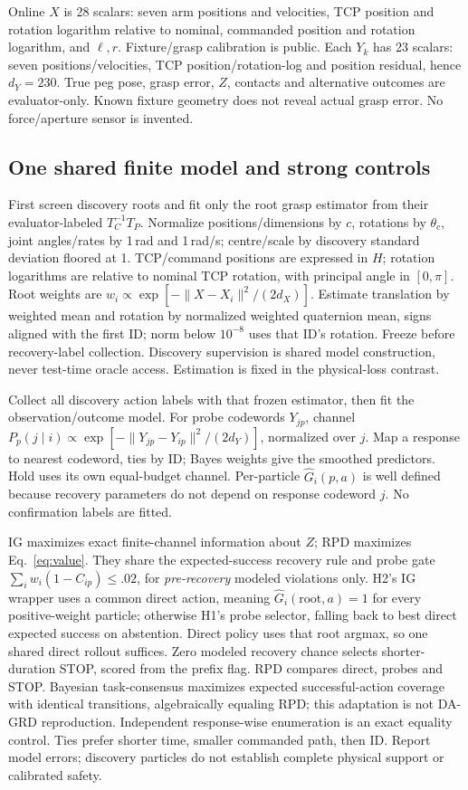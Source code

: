Online $X$ is 28 scalars: seven arm positions and velocities, TCP position and rotation logarithm relative to nominal, commanded position and rotation logarithm, and $\ell,r$. Fixture/grasp calibration is public. Each $Y_k$ has 23 scalars: seven positions/velocities, TCP position/rotation-log and position residual, hence $d_Y=230$. True peg pose, grasp error, $Z$, contacts and alternative outcomes are evaluator-only. Known fixture geometry does not reveal actual grasp error. No force/aperture sensor is invented.

\subsection{One shared finite model and strong controls}
First screen discovery roots and fit only the root grasp estimator from their evaluator-labeled $T_C^{-1}T_P$. Normalize positions/dimensions by $c$, rotations by $\theta_c$, joint angles/rates by 1\,rad and 1\,rad/s; centre/scale by discovery standard deviation floored at 1. TCP/command positions are expressed in $H$; rotation logarithms are relative to nominal TCP rotation, with principal angle in $[0,\pi]$. Root weights are $w_i\propto\exp[-\|X-X_i\|^2/(2d_X)]$. Estimate translation by weighted mean and rotation by normalized weighted quaternion mean, signs aligned with the first ID; norm below $10^{-8}$ uses that ID's rotation. Freeze before recovery-label collection. Discovery supervision is shared model construction, never test-time oracle access. Estimation is fixed in the physical-loss contrast.

Collect all discovery action labels with that frozen estimator, then fit the observation/outcome model. For probe codewords $Y_{jp}$, channel $P_p(j\mid i)\propto\exp[-\|Y_{jp}-Y_{ip}\|^2/(2d_Y)]$, normalized over $j$. Map a response to nearest codeword, ties by ID; Bayes weights give the smoothed predictors. Hold uses its own equal-budget channel. Per-particle $\widehat G_i(p,a)$ is well defined because recovery parameters do not depend on response codeword $j$. No confirmation labels are fitted.

IG maximizes exact finite-channel information about $Z$; RPD maximizes Eq.~\eqref{eq:value}. They share the expected-success recovery rule and probe gate $\sum_iw_i(1-C_{ip})\le.02$, for \emph{pre-recovery} modeled violations only. H2's IG wrapper uses a common direct action, meaning $\widehat G_i(\mathrm{root},a)=1$ for every positive-weight particle; otherwise H1's probe selector, falling back to best direct expected success on abstention. Direct policy uses that root argmax, so one shared direct rollout suffices. Zero modeled recovery chance selects shorter-duration STOP, scored from the prefix flag. RPD compares direct, probes and STOP. Bayesian task-consensus maximizes expected successful-action coverage with identical transitions, algebraically equaling RPD; this adaptation is not DA-GRD reproduction. Independent response-wise enumeration is an exact equality control. Ties prefer shorter time, smaller commanded path, then ID. Report model errors; discovery particles do not establish complete physical support or calibrated safety.

